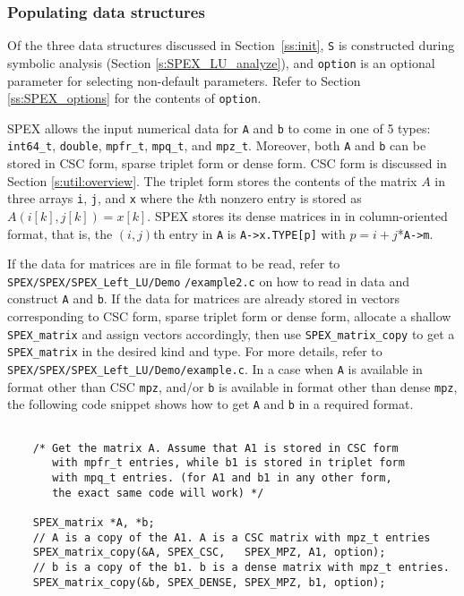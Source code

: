 \documentclass[12pt]{report}
\theoremstyle{definition}
\begin{document}
\subsubsection{Populating data structures}
\label{ss:populate_Ab}

Of the three data structures discussed in Section~\ref{ss:init}, \verb|S| is
constructed during symbolic analysis (Section \ref{s:SPEX_LU_analyze}), and
\verb|option| is an optional parameter for selecting non-default parameters.
Refer to Section \ref{ss:SPEX_options} for the contents of \verb|option|.

SPEX allows the input numerical data for \verb|A| and \verb|b| to come in
one of 5 types: \verb|int64_t|, \verb|double|, \verb|mpfr_t|, \verb|mpq_t|,
and \verb|mpz_t|. Moreover, both \verb|A| and \verb|b| can be stored in
CSC form, sparse triplet form or dense form. CSC form is discussed in Section
\ref{s:util:overview}. The triplet form stores the contents of the matrix $A$
in three arrays \verb|i|, \verb|j|, and \verb|x| where the $k$th nonzero entry
is stored as $A ( i[k], j[k]) = x[k]$. SPEX stores its dense matrices in
in column-oriented format, that is, the $(i,j)$th entry in \verb|A|
is \verb|A->x.TYPE[p]| with $p = i+j$*\verb|A->m|.

If the data for matrices are in file format to be read, refer to
\newline \verb|SPEX/SPEX/SPEX_Left_LU/Demo| \verb|/example2.c| on how to read in data and construct
\verb|A| and \verb|b|. If the data for matrices are already stored in vectors
corresponding to CSC form, sparse triplet form or dense form, allocate a
shallow \verb|SPEX_matrix| and assign vectors accordingly, then use
\verb|SPEX_matrix_copy| to get a \verb|SPEX_matrix| in the desired kind and
type. For more details, refer to \verb|SPEX/SPEX/SPEX_Left_LU/Demo/example.c|. In a case when
\verb|A| is available in format other than CSC \verb|mpz|, and/or \verb|b| is
available in format other than dense \verb|mpz|, the following code snippet
shows how to get \verb|A| and \verb|b| in a required format.

{\small
\begin{verbatim}

    /* Get the matrix A. Assume that A1 is stored in CSC form
       with mpfr_t entries, while b1 is stored in triplet form
       with mpq_t entries. (for A1 and b1 in any other form,
       the exact same code will work) */

    SPEX_matrix *A, *b;
    // A is a copy of the A1. A is a CSC matrix with mpz_t entries
    SPEX_matrix_copy(&A, SPEX_CSC,   SPEX_MPZ, A1, option);
    // b is a copy of the b1. b is a dense matrix with mpz_t entries. 
    SPEX_matrix_copy(&b, SPEX_DENSE, SPEX_MPZ, b1, option);
    \end{verbatim} }
\end{document}
